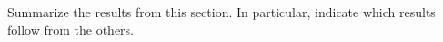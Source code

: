 \documentclass[12pt,noauthor,nooutcomes,handout,hints,newpage]{ximera}
\begin{document}














\begin{problem}
Summarize the results from this section. In particular, indicate which
results follow from the others.
\begin{freeResponse}
\end{freeResponse}
\end{problem}
\end{document}

